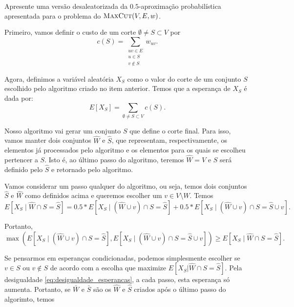 \begin{homeworkProblem}[]
Apresente uma versão desaleatorizada da $0.5$-aproximação probabilística apresentada para o problema do $\textsc{MaxCut}(V, E, w)$.

\begin{homeworkProblemAnswer}
Primeiro, vamos definir o custo de um corte $\emptyset \neq S \subset V$ por
$$ c(S) = \sum \limits_{\substack{uv \in E\\ u \in S \\ v \notin S}} w_{uv}. $$

Agora, definimos a variável aleatória $X_S$ como o valor do corte de um conjunto $S$ escolhido pelo algoritmo criado no item anterior. Temos que a esperança de $X_S$ é dada por:
$$ E[X_S] = \sum \limits_{\emptyset \neq S \subset V} c(S). $$

Nosso algoritmo vai gerar um conjunto $S$ que define o corte final. Para isso, vamos manter dois conjuntos $\hat{W}$ e $\hat{S}$, que representam, respectivamente, os elementos já processados pelo algoritmo e os elementos para os quais se escolheu pertencer a $S$. Isto é, ao último passo do algoritmo, teremos $\hat{W} = V$ e $S$ será definido pelo $\hat{S}$ e retornado pelo algoritmo.  

Vamos considerar um passo qualquer do algoritmo, ou seja, temos dois conjuntos $\hat{S}$ e $\hat{W}$ como definidos acima e queremos escolher um $v \in V \setminus \hat{W}$. Temos
$$ E[X_S \mid \hat{W} \cap S = \hat{S}] = 0.5 * E[X_S \mid (\hat{W} \cup v) \cap S = \hat{S}] + 0.5 * E[X_S \mid (\hat{W} \cup v) \cap S = \hat{S} \cup v].$$

Portanto, 
\begin{equation} \label{eq:desigualdade_esperancas}
    \max(E[X_S \mid (\hat{W} \cup v) \cap S = \hat{S}], E[X_S \mid (\hat{W} \cup v) \cap S = \hat{S} \cup v]) \geq E[X_S \mid \hat{W} \cap S = \hat{S}].
\end{equation}

Se pensarmos em esperanças condicionadas, podemos simplesmente escolher se $v \in S$ ou $v \notin S$ de acordo com a escolha que maximize $E[X_S | \hat{W} \cap S = \hat{S}]$. Pela desigualdade \eqref{eq:desigualdade_esperancas}, a cada passo, esta esperança só aumenta. Portanto, se $\bar{W}$ e $\bar{S}$ são os $\hat{W}$ e $\hat{S}$ criados após o último passo do algorimto, temos


\end{homeworkProblemAnswer}
\end{homeworkProblem}
